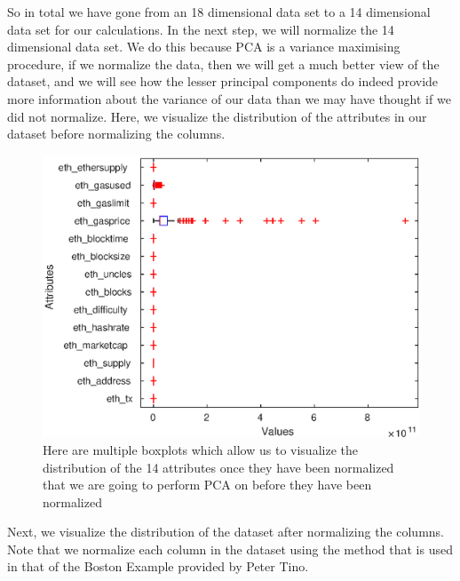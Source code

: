 \documentclass{article}
\begin{document}
So in total we have gone from an 18 dimensional data set to a 14 dimensional data set for our calculations. In the next step, we will normalize the 14 dimensional data set. We do this because PCA is a variance maximising procedure, if we normalize the data, then we will get a much better view of the dataset, and we will see how the lesser principal components do indeed provide more information about the variance of our data than we may have thought if we did not normalize. Here, we visualize the distribution of the attributes in our dataset before normalizing the columns.
\begin{figure}[H]
\centering
\caption{Here are multiple boxplots which allow us to visualize the distribution of the 14  attributes once they have been normalized that we are going to perform PCA on before they have been normalized}
\includegraphics[scale = 0.9]{main/boxplot_before_norm.eps}
\end{figure}


Next, we visualize the distribution of the dataset after normalizing the columns. Note that we normalize each column in the dataset using the method that is used in that of the Boston Example provided by Peter Tino.
\end{document}
